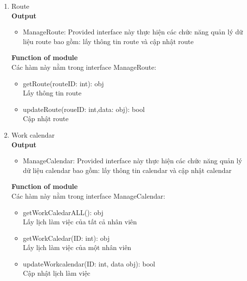 \documentclass[a4paper]{article}
\begin{document}
\begin{enumerate}
\begin{itemize}
 \end{itemize}
 
              \item Route \\
  \textbf{Output}
   \begin{itemize}
     \item ManageRoute: Provided interface này thực hiện các chức năng quản lý dữ liệu route bao gồm: lấy
thông tin route và cập nhật route
 \end{itemize}
  \textbf{Function of module}\\
  Các hàm này nằm trong interface ManageRoute:
     \begin{itemize}
\item getRoute(routeID: int): obj
\\ Lấy thông tin route
\item updateRoute(roueID: int,data: obj): bool
\\ Cập nhật route

 \end{itemize}
 
               \item Work calendar \\
  \textbf{Output}
   \begin{itemize}
     \item ManageCalendar: Provided interface này thực hiện các chức năng quản lý dữ liệu calendar bao gồm:
lấy thông tin calendar và cập nhật calendar
 \end{itemize}
  \textbf{Function of module}\\
  Các hàm này nằm trong interface ManageCalendar:
     \begin{itemize}
\item getWorkCaledarALL(): obj
\\ Lấy lịch làm việc của tất cả nhân viên
\item getWorkCaledar(ID: int): obj
\\ Lấy lịch làm việc của một nhân viên
 \item updateWorkcalendar(ID: int, data obj): bool
\\ Cập nhật lịch làm việc
 \end{itemize}
 

\end{enumerate}
\end{document}
